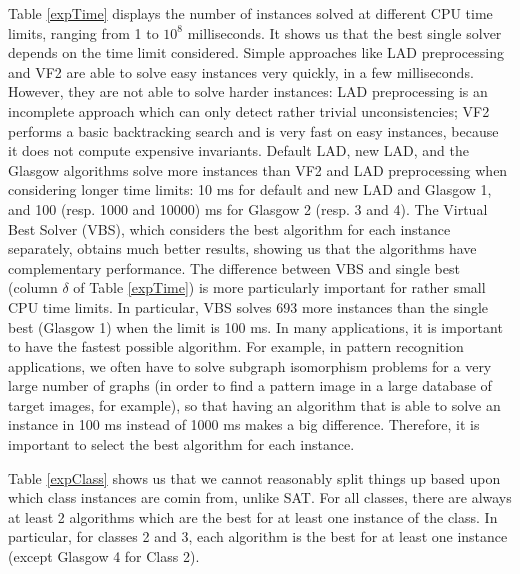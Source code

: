 \documentclass{llncs}
\begin{document}
Table \ref{expTime} displays the number of instances solved at different CPU time limits, ranging from 1 to $10^8$ milliseconds. It shows us that the best single solver depends on the time limit considered. Simple approaches like LAD preprocessing and VF2 are able to solve easy instances very quickly, in a few milliseconds. However, they are not able to solve harder instances: LAD preprocessing is an incomplete approach which can only detect rather trivial unconsistencies; VF2 performs a basic backtracking search and is very fast on easy instances, because it does not compute expensive invariants. Default LAD, new LAD, and the Glasgow algorithms solve more instances than VF2 and LAD preprocessing when considering longer time limits: 10 ms for default and new LAD and Glasgow 1, and 100 (resp. 1000 and 10000) ms for Glasgow 2 (resp. 3 and 4). The Virtual Best Solver (VBS), which considers the best algorithm for each instance separately, obtains much better results, showing us that the algorithms have complementary performance. The difference between VBS and single best (column $\delta$ of Table \ref{expTime}) is more particularly important for rather small CPU time limits. In particular, VBS solves 693 more instances than the single best (Glasgow 1) when the limit is 100 ms. In many applications, it is important to have the fastest possible algorithm. For example, in pattern recognition applications, we often have to solve subgraph isomorphism problems for a very large number of graphs (in order to find a pattern image in a large database of target images, for example), so that having an algorithm that is able to solve an instance in 100 ms instead of 1000 ms makes a big difference. Therefore, it is important to select the best algorithm for each instance.

Table \ref{expClass} shows us that we cannot reasonably split things up based upon which class instances are comin from, unlike SAT. For all classes, there are always at least 2 algorithms which are the best for at least one instance of the class. In particular, for classes 2 and 3, each algorithm is the best for at least one instance (except Glasgow 4 for Class 2).
\end{document}
